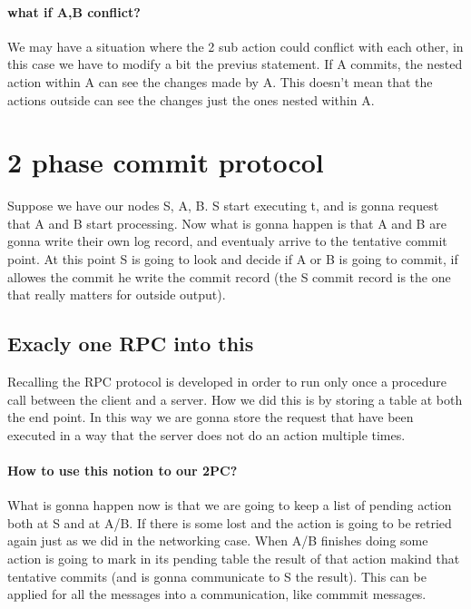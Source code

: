 \documentclass{article}
\begin{document}
    \paragraph{what if A,B conflict?}
      We may have a situation where the 2 sub action could conflict with each other, in this 
      case we have to modify a bit the previus statement. If A commits, the 
      nested action within A can see the changes made by A. This doesn't mean that the actions
      outside can see the changes just the ones nested within A.
  \section{2 phase commit protocol}
    Suppose we have our nodes S, A, B. S start executing t, and is gonna request that A and B
    start processing. Now what is gonna happen is that A and B are gonna write their own log
    record, and eventualy arrive to the tentative commit point. At this point S is going to 
    look and decide if A or B is going to commit, if allowes the commit he write the commit 
    record (the S commit record is the one that really matters for outside output).
    \subsection{Exacly one RPC into this}
      Recalling the RPC protocol is developed in order to run only once a procedure call 
      between the client and a server. How we did this is by storing a table at both the 
      end point. In this way we are gonna store the request that have been executed in a way
      that the server does not do an action multiple times.
      \paragraph{How to use this notion to our 2PC?} What is gonna happen now is that we are
        going to keep a list of pending action both at S and at A/B. If there is some lost and
        the action is going to be retried again just as we did in the networking case. When 
        A/B finishes doing some action is going to mark in its pending table the result of 
        that action makind that tentative commits (and is gonna communicate to S the result).
        This can be applied for all the messages into a communication, like commmit messages.
\end{document}
